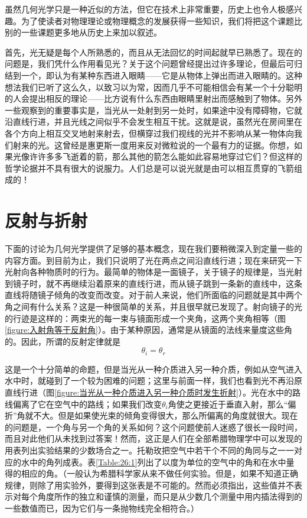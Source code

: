 虽然几何光学只是一种近似的方法，但它在技术上非常重要，历史上也令人极感兴趣。为了使读者对物理理论或物理概念的发展获得一些知识，我们将把这个课题比别的一些课题更多地从历史上来加以叙述。

首先，光无疑是每个人所熟悉的，而且从无法回忆的时间起就早已熟悉了。现在的问题是，我们凭什么作用看见光？关于这个问题曾经提出过许多理论，但最后可归结到一个，即认为有某种东西进入眼睛——它是从物体上弹出而进入眼睛的。这种想法我们已听了这么久，以致习以为常，因而几乎不可能相信会有某一个十分聪明的人会提出相反的理论——比方说有什么东西由眼睛里射出而感触到了物体。另外一些观察到的重要事实是，当光从一处射到另一处时，如果途中没有障碍物，它就沿直线行进，并且光线之间似乎不会发生相互干扰。这就是说，虽然光在房间里在各个方向上相互交叉地射来射去，但横穿过我们视线的光并不影响从某一物体向我们射来的光。这曾经是惠更斯一度用来反对微粒说的一个最有力的证据。你想，如果光像许许多多飞逝着的箭，那么其他的箭怎么能如此容易地穿过它们？但这样的哲学论据并不具有很大的说服力。人们总是可以说光就是由可以相互贯穿的飞箭组成的！

\section{反射与折射}

下面的讨论为几何光学提供了足够的基本概念，现在我们要稍微深入到定量一些的内容方面。到目前为止，我们只说明了光在两点之间沿直线行进；现在来研究一下光射向各种物质时的行为。最简单的物体是一面镜子，关于镜子的规律是，当光射到镜子时，就不再继续沿着原来的直线行进，而从镜子跳到一条新的直线中，这条直线将随镜子倾角的改变而改变。对于前人来说，他们所面临的问题就是其中两个角之间有什么关系？这是一种很简单的关系，并且很早就已发现了。射向镜子的光的行迹是这样的：两束光的每一束与镜面形成一个夹角，这两个夹角相等（图\ref{figure:入射角等于反射角}）。由于某种原因，通常是从镜面的法线来量度这些角的。因此，所谓的反射定律就是
\begin{equation}
    \label{Eq:I:26:1}
    \theta_i = \theta_r
\end{equation}

这是一个十分简单的命题，但是当光从一种介质进入另一种介质，例如从空气进入水中时，就碰到了一个较为困难的问题；这里与前面一样，我们也看到光不再沿原直线行进（图\ref{figure:当光从一种介质进入另一种介质时发生折射}）。光在水中的路线偏离了它在空气中的路线；如果我们改变$\theta_i$角使之更接近于垂直入射，那么“偏折”角就不大。但是如果使光束的倾角变得很大，那么所偏离的角度就很大。现在的问题是，一个角与另一个角的关系如何？这个问题使前人迷惑了很长一段时间，而且对此他们从未找到过答案！然而，这正是人们在全部希腊物理学中可以发现的用表列出实验结果的少数场合之一。托勒玫把空气中若干个不同的角同与之一一对应的水中的角列成表。表\ref{Table:26:1}列出了以度为单位的空气中的角和在水中量得的相应的角。（一般认为希腊科学家从来不做任何实验。但是，如果不知道正确规律，则除了用实验外，要得到这张表是不可能的。然而必须指出，这些值并不表示对每个角度所作的独立和谨慎的测量，而只是从少数几个测量中用内插法得到的一些数值而已，因为它们与一条抛物线完全相符合。）


